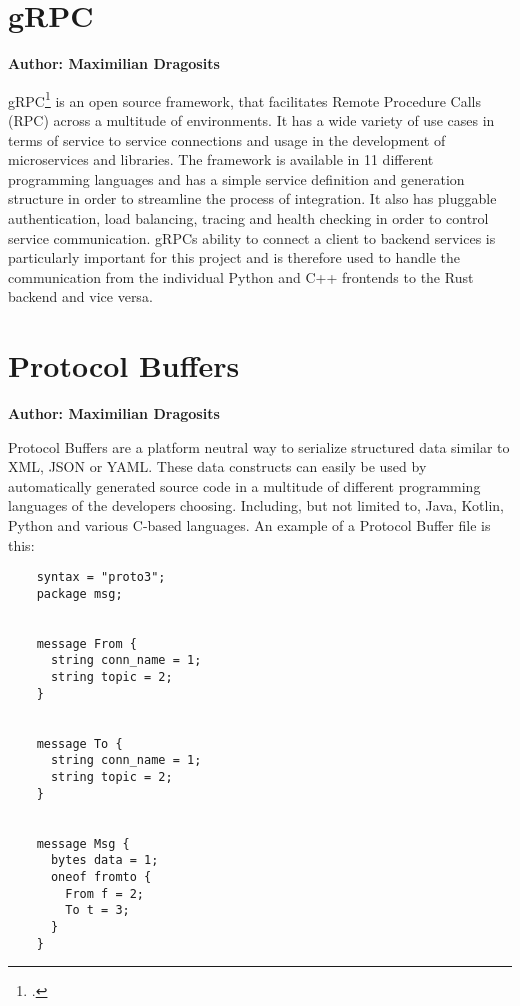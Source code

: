 \section{gRPC}
\textbf{Author: Maximilian Dragosits}

gRPC\footcite{grpc_main_site} is an open source framework, that facilitates Remote Procedure Calls (RPC) across a multitude of environments. It has a wide variety of use cases in terms of
service to service connections and usage in the development of microservices and libraries. The framework is available in 11 different programming languages and 
has a simple service definition and generation structure in order to streamline the process of integration. It also has pluggable authentication, load balancing, tracing
and health checking in order to control service communication. gRPCs ability to connect a client to backend services is particularly important for this project 
and is therefore used to handle the communication from the individual Python and C++ frontends to the Rust backend and vice versa.

\section{Protocol Buffers}
\textbf{Author: Maximilian Dragosits}

Protocol Buffers are a platform neutral way to serialize structured data similar to XML, JSON or YAML. These data constructs can easily be used by automatically
generated source code in a multitude of different programming languages of the developers choosing. Including, but not limited to, Java, Kotlin, Python and various
C-based languages. An example of a Protocol Buffer file is this:

\begin{verbatim}
    syntax = "proto3";
    package msg;
    
    
    message From {
      string conn_name = 1;
      string topic = 2;
    }
    
    
    message To {
      string conn_name = 1;
      string topic = 2;
    }
    
    
    message Msg {
      bytes data = 1;
      oneof fromto {
        From f = 2;
        To t = 3;
      }
    }
\end{verbatim}

